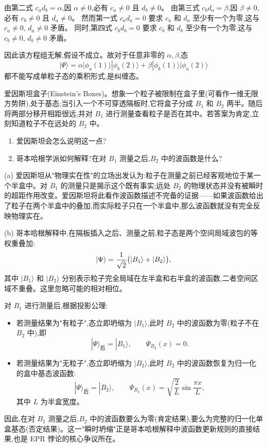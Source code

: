 \begin{question}
\begin{solution}
由第二式 $c_a d_b = \alpha$,因 $\alpha\neq0$,必有 $c_a\neq0$ 且 $d_b\neq0$。
由第三式 $c_b d_a = \beta$,因 $\beta\neq0$,必有 $c_b\neq0$ 且 $d_a\neq0$。
然而第一式 $c_a d_a = 0$ 要求 $c_a$ 和 $d_a$ 至少有一个为零,这与 $c_a\neq0$, $d_a\neq0$ 矛盾。
同时,第四式 $c_b d_b = 0$ 要求 $c_b$ 和 $d_b$ 至少有一个为零,这与 $c_b\neq0$, $d_b\neq0$ 矛盾。

因此该方程组无解,假设不成立。故对于任意非零的 $\alpha,\beta$,态
\[
\boxed{|\Psi\rangle=\alpha|\phi_a(1)\rangle|\phi_b(2)\rangle+\beta|\phi_b(1)\rangle|\phi_a(2)\rangle}
\]
都不能写成单粒子态的乘积形式,是纠缠态。
\end{solution}
\end{question}

\begin{question}
爱因斯坦盒子(Einstein's Boxes)。想象一个粒子被限制在盒子里(可看作一维无限方势阱),处于基态;当引入一个不可穿透隔板时,它将盒子分成 $B_1$ 和 $B_2$ 两半。随后将两部分移开相距很远,并对 $B_1$ 进行测量查看粒子是否在其中。若答案为肯定,立刻知道粒子不在远处的 $B_2$ 中。
\begin{enumerate}
\item 爱因斯坦会怎么说明这一点?
\item 哥本哈根学派如何解释?在对 $B_1$ 测量之后,$B_2$ 中的波函数是什么?
\end{enumerate}
\begin{solution}
(a) 爱因斯坦从"物理实在性"的立场出发认为:粒子在测量之前已经客观地位于某一个半盒中。对 $B_1$ 的测量只是揭示这个既有事实;远处 $B_2$ 的物理状态并没有被瞬时的超距作用改变。爱因斯坦将此看作波函数描述不完备的证据——如果波函数给出了粒子在两个半盒中的叠加,而实际粒子只在一个半盒中,那么波函数就没有完全反映物理实在。

(b) 哥本哈根解释中,在隔板插入之后、测量之前,粒子态是两个空间局域波包的等权重叠加:
\[
|\Psi\rangle={1\over\sqrt2}\bigl(|B_1\rangle+|B_2\rangle\bigr),
\]
其中 $|B_1\rangle$ 和 $|B_2\rangle$ 分别表示粒子完全局域在左半盒和右半盒的波函数,二者空间区域不重叠。这里忽略可能的相对相位。

对 $B_1$ 进行测量后,根据投影公理:
\begin{itemize}
\item 若测量结果为"有粒子",态立即坍缩为 $|B_1\rangle$,此时 $B_2$ 中的波函数为零(粒子不在 $B_2$ 中),即
\[
|\Psi\rangle_{\text{后}} = |B_1\rangle,\qquad \Psi_{B_2}(x)=0.
\]
\item 若测量结果为"无粒子",态立即坍缩为 $|B_2\rangle$,此时 $B_2$ 中的波函数恢复为归一化的盒中基态波函数:
\[
|\Psi\rangle_{\text{后}} = |B_2\rangle,\qquad \Psi_{B_2}(x) = \sqrt{\frac{2}{L}}\sin\frac{\pi x}{L},
\]
其中 $L$ 为半盒宽度。
\end{itemize}

因此,在对 $B_1$ 测量之后,$B_2$ 中的波函数要么为零(肯定结果),要么为完整的归一化单盒基态(否定结果)。这一"瞬时坍缩"正是哥本哈根解释中波函数更新规则的直接结果,也是 EPR 悖论的核心争议所在。
\end{solution}
\end{question}

